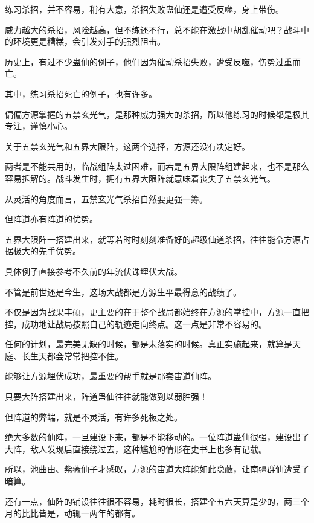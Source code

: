 
\begin{this_body}



练习杀招，并不容易，稍有大意，杀招失败蛊仙还是遭受反噬，身上带伤。

威力越大的杀招，风险越高，但不练还不行，总不能在激战中胡乱催动吧？战斗中的环境更是糟糕，会引发对手的强烈阻击。

历史上，有过不少蛊仙的例子，他们因为催动杀招失败，遭受反噬，伤势过重而亡。

其中，练习杀招死亡的例子，也有许多。

偏偏方源掌握的五禁玄光气，是那种威力强大的杀招，所以他练习的时候都是极其专注，谨慎小心。

关于五禁玄光气和五界大限阵，这两个选择，方源还没有决定好。

两者是不能共用的，临战组阵太过困难，而若是五界大限阵组建起来，也不是那么容易拆解的。战斗发生时，拥有五界大限阵就意味着丧失了五禁玄光气。

从灵活的角度而言，五禁玄光气杀招自然要更强一筹。

但阵道亦有阵道的优势。

五界大限阵一搭建出来，就等若时时刻刻准备好的超级仙道杀招，往往能令方源占据极大的先手优势。

具体例子直接参考不久前的年流伏诛埋伏大战。

不管是前世还是今生，这场大战都是方源生平最得意的战绩了。

不仅是因为战果丰硕，更主要的在于整个战局都始终在方源的掌控中，方源一直把控，成功地让战局按照自己的轨迹走向终点。这一点是非常不容易的。

任何的计划，最完美无缺的时候，都是未落实的时候。真正实施起来，就算是天庭、长生天都会常常把控不住。

能够让方源埋伏成功，最重要的帮手就是那套宙道仙阵。

只要大阵搭建出来，阵道蛊仙往往就能做到以弱胜强！

但阵道的弊端，就是不灵活，有许多死板之处。

绝大多数的仙阵，一旦建设下来，都是不能移动的。一位阵道蛊仙很强，建设出了大阵，敌人发现后直接绕过去，这种尴尬的情形在史书上也多有记载。

所以，池曲由、紫薇仙子才感叹，方源的宙道大阵能如此隐蔽，让南疆群仙遭受了暗算。

还有一点，仙阵的铺设往往很不容易，耗时很长，搭建个五六天算是少的，两三个月的比比皆是，动辄一两年的都有。


\end{this_body}
